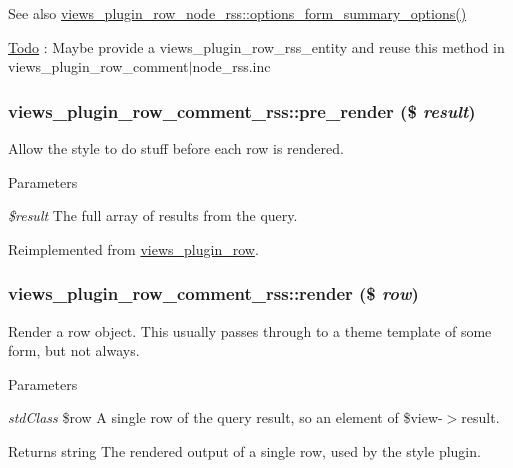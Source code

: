 \begin{DoxySeeAlso}{See also}
\hyperlink{classviews__plugin__row__node__rss_a266e0776cfa7c86a98453b59215da8aa}{views\_\-plugin\_\-row\_\-node\_\-rss::options\_\-form\_\-summary\_\-options()} 
\end{DoxySeeAlso}
\begin{Desc}
\item[\hyperlink{todo__todo000053}{Todo}]: Maybe provide a views\_\-plugin\_\-row\_\-rss\_\-entity and reuse this method in views\_\-plugin\_\-row\_\-comment$|$node\_\-rss.inc \end{Desc}
\hypertarget{classviews__plugin__row__comment__rss_a1c64dc0cd4f677ddb85a0dbedfae291e}{
\subsubsection[{pre\_\-render}]{\setlength{\rightskip}{0pt plus 5cm}views\_\-plugin\_\-row\_\-comment\_\-rss::pre\_\-render (\$ {\em result})}}
\label{classviews__plugin__row__comment__rss_a1c64dc0cd4f677ddb85a0dbedfae291e}
Allow the style to do stuff before each row is rendered.


\begin{DoxyParams}{Parameters}
\item[{\em \$result}]The full array of results from the query. \end{DoxyParams}


Reimplemented from \hyperlink{classviews__plugin__row_ae49a23f750874e4b3d294aa3a20ecd64}{views\_\-plugin\_\-row}.\hypertarget{classviews__plugin__row__comment__rss_a89b115cbc1807d3b9659627f351b97e7}{
\subsubsection[{render}]{\setlength{\rightskip}{0pt plus 5cm}views\_\-plugin\_\-row\_\-comment\_\-rss::render (\$ {\em row})}}
\label{classviews__plugin__row__comment__rss_a89b115cbc1807d3b9659627f351b97e7}
Render a row object. This usually passes through to a theme template of some form, but not always.


\begin{DoxyParams}{Parameters}
\item[{\em stdClass}]\$row A single row of the query result, so an element of \$view-\/$>$result.\end{DoxyParams}
\begin{DoxyReturn}{Returns}
string The rendered output of a single row, used by the style plugin. 
\end{DoxyReturn}


